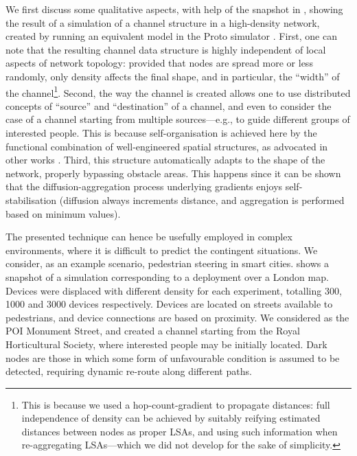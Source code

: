 \documentclass[12pt,a4paper,twoside,openright]{book}
\begin{document}
We first discuss some qualitative aspects, with help of the snapshot in , showing the result of a simulation of a channel structure in a high-density network, created by running an equivalent model in the Proto simulator \cite{proto}.
%
First, one can note that the resulting channel data structure is highly independent of local aspects of network topology: provided that nodes are spread more or less randomly, only density affects the final shape, and in particular, the ``width'' of the channel\footnote{This is because we used a hop-count-gradient to propagate distances: full independence of density can be achieved by suitably reifying estimated distances between nodes as proper LSAs, and using such information when re-aggregating LSAs---which we did not develop for the sake of simplicity.}.
%
Second, the way the channel is created allows one to use distributed concepts of ``source'' and ``destination'' of a channel, and even to consider the case of a channel starting from multiple sources---e.g., to guide different groups of interested people.
%
This is because self-organisation is achieved here by the functional combination of well-engineered spatial structures, as advocated in other works \cite{SpatialIGI2013}.
%
Third, this structure automatically adapts to the shape of the network, properly bypassing obstacle areas.
%
This happens since it can be shown that the diffusion-aggregation process underlying gradients enjoys self-stabilisation \cite{VD-COORD2014-LNCS2014} (diffusion always increments distance, and aggregation is performed based on minimum values).

The presented technique can hence be usefully employed in complex environments, where it is difficult to predict the contingent situations.
%
We consider, as an example scenario, pedestrian steering in smart cities.
%
 shows a snapshot of a simulation corresponding to a deployment over a London map.
%
Devices were displaced with different density for each experiment, totalling 300, 1000 and 3000 devices respectively.
%
Devices are located on streets available to pedestrians, and device connections are based on proximity.
%
We considered as the POI Monument Street, and created a channel starting from the Royal Horticultural Society, where interested people may be initially located.
%
Dark nodes are those in which some form of unfavourable condition is assumed to be detected, requiring dynamic re-route along different paths.
\end{document}

